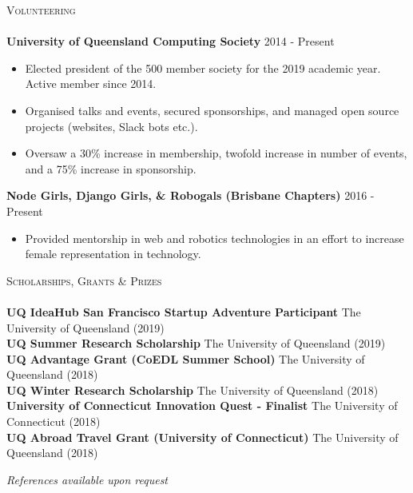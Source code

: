 \documentclass[a4paper]{article}
\newcommand{\lineunder} {
    \vspace*{-8pt} \\
    \hspace*{-10pt} \hrulefill \\
}
\newcommand{\header} [1] {
    {\hspace*{-10pt}\vspace*{6pt} \textsc{#1}}
    \vspace*{-6pt} \lineunder
}
\newenvironment{singleitem}
{   \small
    \vspace{0pt}
    \begin{itemize}
    \setlength{\itemsep}{0pt}
    \setlength{\parskip}{0pt}
    \setlength{\parsep}{0pt}   }
{\end{itemize} \vspace{1pt}	}
\begin{document}
\header{Volunteering}
\textbf{University of Queensland Computing Society} \hfill 2014 - Present\\
\begin{singleitem}
	\item Elected president of the 500 member society for the 2019 academic year. Active member since 2014.
	\item Organised talks and events, secured sponsorships, and managed open source projects (websites, Slack bots etc.).
	\item Oversaw a 30\% increase in membership, twofold increase in number of events, and a 75\% increase in sponsorship.
\end{singleitem}
\textbf{Node Girls, Django Girls, \& Robogals (Brisbane Chapters)} \hfill 2016 - Present\\
\begin{singleitem}
	\item Provided mentorship in web and robotics technologies in an effort to increase female representation in technology.
\end{singleitem}

\vspace{1.5mm}

\header{Scholarships, Grants \& Prizes}
\textbf{UQ IdeaHub San Francisco Startup Adventure Participant} \hfill The University of Queensland (2019)\\
\textbf{UQ Summer Research Scholarship} \hfill The University of Queensland (2019)\\
\textbf{UQ Advantage Grant (CoEDL Summer School)} \hfill The University of Queensland (2018)\\
\textbf{UQ Winter Research Scholarship} \hfill The University of Queensland (2018)\\
\textbf{University of Connecticut Innovation Quest - Finalist} \hfill The University of Connecticut (2018)\\
\textbf{UQ Abroad Travel Grant (University of Connecticut)} \hfill The University of Queensland (2018)\\


\vspace{3mm}
\begin{center}
\small \textit{References available upon request}
\end{center}
\end{document}
